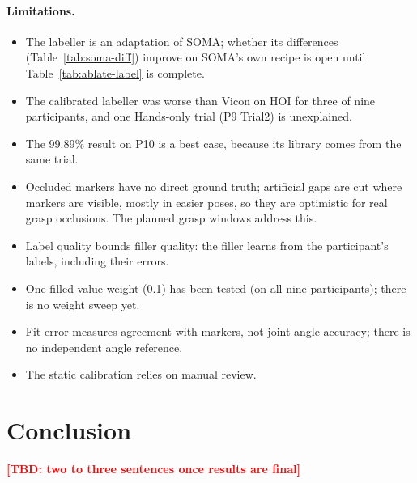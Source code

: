 \documentclass[11pt,a4paper]{article}
\newcommand{\tbd}[1]{\textcolor{red}{\textbf{[TBD: #1]}}}
\begin{document}
\paragraph{Limitations.}
\begin{itemize}[nosep]
  \item The labeller is an adaptation of SOMA; whether its differences (Table~\ref{tab:soma-diff}) improve on SOMA's own
  recipe is open until Table~\ref{tab:ablate-label} is complete.
  \item The calibrated labeller was worse than Vicon on HOI for three of nine participants, and one Hands-only trial (P9
  Trial2) is unexplained.
  \item The 99.89\% result on P10 is a best case, because its library comes from the same trial.
  \item Occluded markers have no direct ground truth; artificial gaps are cut where markers are visible, mostly in
  easier poses, so they are optimistic for real grasp occlusions. The planned grasp windows address this.
  \item Label quality bounds filler quality: the filler learns from the participant's labels, including their errors.
  \item One filled-value weight (0.1) has been tested (on all nine participants); there is no weight sweep yet.
  \item Fit error measures agreement with markers, not joint-angle accuracy; there is no independent angle reference.
  \item The static calibration relies on manual review.
\end{itemize}

\section{Conclusion}
\tbd{two to three sentences once results are final}

\end{document}
